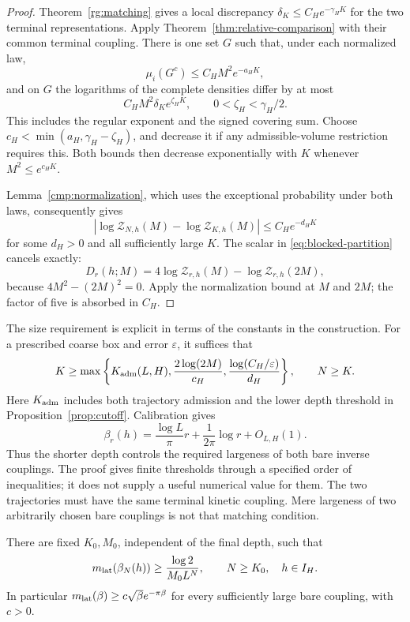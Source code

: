 \begin{proof}
Theorem~\ref{rg:matching} gives a local discrepancy
$\delta_K\le C_He^{-\gamma_HK}$ for the two terminal representations.
Apply Theorem~\ref{thm:relative-comparison} with their common terminal
coupling. There is one set $G$ such that, under each normalized law,
\[
 \mu_i(G^c)\le C_HM^2e^{-a_HK},
\]
and on $G$ the logarithms of the complete densities differ by at most
\[
 C_HM^2\delta_K e^{\zeta_HK},\qquad 0<\zeta_H<\gamma_H/2.
\]
This includes the regular exponent and the signed covering sum.
Choose $c_H<\min(a_H,\gamma_H-\zeta_H)$, and decrease it if any
admissible-volume restriction requires this. Both bounds then decrease
exponentially with $K$ whenever $M^2\le e^{c_HK}$.

Lemma~\ref{cmp:normalization}, which uses the exceptional probability
under both laws, consequently gives
\[
 |\log\mathcal Z_{N,h}(M)-\log\mathcal Z_{K,h}(M)|
                  \le C_He^{-d_HK}
\]
for some $d_H>0$ and all sufficiently large $K$.
The scalar in \eqref{eq:blocked-partition} cancels exactly:
\[
 D_r(h;M)=4\log\mathcal Z_{r,h}(M)-\log\mathcal Z_{r,h}(2M),
\]
because $4M^2-(2M)^2=0$. Apply the normalization bound at $M$ and $2M$;
the factor of five is absorbed in $C_H$.
\end{proof}

The size requirement is explicit in terms of the constants in the
construction. For a prescribed coarse box and error $\varepsilon$, it
suffices that
\begin{equation}
\label{eq:K-threshold}
 K\ge\max\left\{K_{\rm adm}(L,H),\frac{2\log(2M)}{c_H},
                        \frac{\log(C_H/\varepsilon)}{d_H}\right\},
 \qquad N\ge K.
\end{equation}
Here $K_{\rm adm}$ includes both trajectory admission and the lower
depth threshold in Proposition~\ref{prop:cutoff}.
Calibration gives
\begin{equation}
\label{eq:beta-depth}
 \beta_r(h)=\frac{\log L}{\pi}r+\frac1{2\pi}\log r+O_{L,H}(1).
\end{equation}
Thus the shorter depth controls the required largeness of both bare
inverse couplings. The proof gives finite thresholds through a specified
order of inequalities; it does not supply a useful numerical value for
them. The two trajectories must have the same terminal kinetic
coupling. Mere largeness of two arbitrarily chosen bare couplings is
not that matching condition.

\begin{theorem}
\label{thm:lower}
There are fixed $K_0,M_0$, independent of the final depth, such that
\begin{equation}
\label{eq:lower-depth}
 m_{\mathrm{lat}}(\beta_N(h))\ge\frac{\log2}{M_0L^N},
 \qquad N\ge K_0,\quad h\in I_H.
\end{equation}
In particular $m_{\mathrm{lat}}(\beta)\ge c\sqrt\beta e^{-\pi\beta}$ for every
sufficiently large bare coupling, with $c>0$.
\end{theorem}

